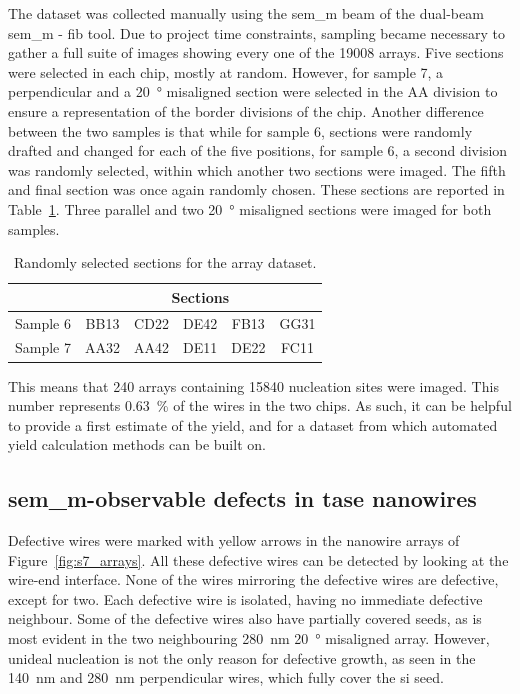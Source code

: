 The dataset was collected manually using the \acs{sem_m} beam of the dual-beam \acs{sem_m} - \acs{fib} tool. Due to project time constraints, sampling became necessary to gather a full suite of images showing every one of the \num{19008} arrays. Five sections were selected in each chip, mostly at random. However, for sample 7, a perpendicular and a \qty{20}{\degree} misaligned section were selected in the AA division to ensure a representation of the border divisions of the chip. Another difference between the two samples is that while for sample 6, sections were randomly drafted and changed for each of the five positions, for sample 6, a second division was randomly selected, within which another two sections were imaged. The fifth and final section was once again randomly chosen. These sections are reported in Table~\ref{tab:dataset_sections}. Three parallel and two \qty{20}{\degree} misaligned sections were imaged for both samples.

\begin{table}
    \centering
    \caption{Randomly selected sections for the array dataset.}
    \begin{tabular}{c|c c c c c}
         & \multicolumn{5}{c}{Sections} \\ \hline
        Sample 6 & BB13 & CD22 & DE42 & FB13 & GG31 \\
        Sample 7 & AA32 & AA42 & DE11 & DE22 & FC11 \\ \hline \hline
    \end{tabular}
    \label{tab:dataset_sections}
\end{table}

This means that 240 arrays containing 15840 nucleation sites were imaged. This number represents \qty{0.63}{\percent} of the wires in the two chips. As such, it can be helpful to provide a first estimate of the yield, and for a dataset from which automated yield calculation methods can be built on.

\subsection{\texorpdfstring{\acs{sem_m}-observable defects in \acs{tase} nanowires}{SEM observable defects in TASE nanowires}}

Defective wires were marked with yellow arrows in the nanowire arrays of Figure~\ref{fig:s7_arrays}. All these defective wires can be detected by looking at the wire-end interface. None of the wires mirroring the defective wires are defective, except for two. Each defective wire is isolated, having no immediate defective neighbour. Some of the defective wires also have partially covered seeds, as is most evident in the two neighbouring \qty{280}{\nano\metre} \qty{20}{\degree} misaligned array. However, unideal nucleation is not the only reason for defective growth, as seen in the \qty{140}{\nano\metre} and \qty{280}{\nano\metre} perpendicular wires, which fully cover the \acl{si} seed.

